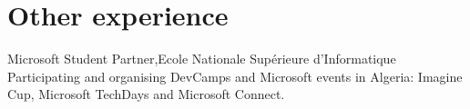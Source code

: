 \section{Other experience}
  \resumeSubHeadingListStart
    \resumeSubheading
    {Microsoft Student Partner,}{Ecole Nationale Supérieure d’Informatique}{}
    {}
      \resumeItemListStart
        \vspace{+10pt}
        \renewcommand{\labelitemii}{\raisebox{.25cm}{$\bullet$}}
        {Participating and organising DevCamps and Microsoft events in Algeria: Imagine Cup, Microsoft TechDays and Microsoft Connect.}
      \resumeItemListEnd
  \resumeSubHeadingListEnd